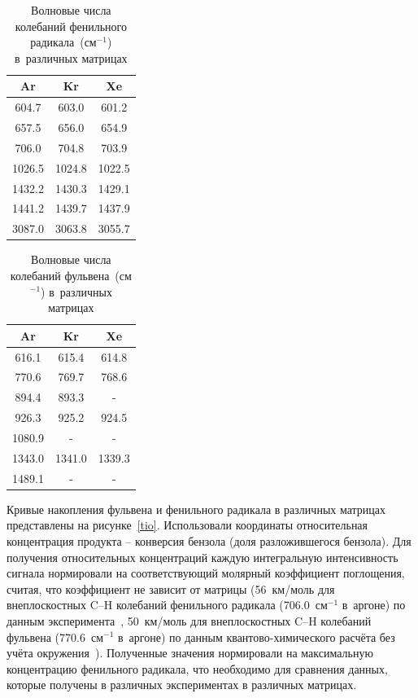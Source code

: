 {\begin{table}[H]
\caption{Волновые числа колебаний фенильного радикала~(см$^{-1}$) в~различных матрицах}
\label{tabl:phenyl}
\begin{center}
\begin{tabular}{ccc}
Ar & Kr & Xe \\
\hline
604.7 & 603.0 & 601.2 \\
657.5 & 656.0 & 654.9 \\
706.0 & 704.8 & 703.9 \\
1026.5 & 1024.8 & 1022.5 \\
1432.2 & 1430.3 & 1429.1 \\
1441.2 & 1439.7 & 1437.9 \\
3087.0 & 3063.8 & 3055.7 \\
\end{tabular}
\end{center}
\end{table}

\begin{table}[H]
\caption{Волновые числа колебаний фульвена~(см$^{-1}$) в~различных матрицах}
\label{fulvene}
\begin{center}
\begin{tabular}{ccc}
Ar & Kr & Xe \\
\hline
616.1 & 615.4 & 614.8 \\
770.6 & 769.7 & 768.6 \\
894.4 & 893.3 & - \\
926.3 & 925.2 & 924.5 \\
1080.9 & - & - \\
1343.0 & 1341.0 & 1339.3 \\
1489.1 & - & - \\
\end{tabular}
\end{center}
\end{table}

Кривые накопления фульвена и фенильного радикала в различных матрицах представлены на рисунке~\ref{tio}. Использовали координаты относительная концентрация продукта -- конверсия бензола (доля разложившегося бензола).
Для получения относительных концентраций каждую интегральную интенсивность сигнала
нормировали на соответствующий молярный коэффициент поглощения, считая, что коэффициент не зависит от матрицы (56~км/моль для внеплоскостных C--H  колебаний фенильного радикала 
(706.0~см$^{-1}$ в~аргоне) по данным эксперимента~\cite{Friderichsen2001}, 50~км/моль  для внеплоскостных C--H колебаний фульвена (770.6~см$^{-1}$ в~аргоне) по данным квантово-химического расчёта без учёта окружения~\cite{Toh2015}). Полученные значения нормировали на максимальную концентрацию фенильного радикала, что необходимо для сравнения данных, которые получены в различных экспериментах в различных матрицах.

}

